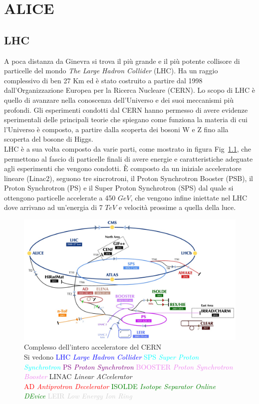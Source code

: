 \chapter{ALICE}

\section{LHC}
A poca distanza da Ginevra si trova il più grande e il più potente collisore di particelle del mondo \textit{The Large Hadron Collider} (LHC). Ha un raggio complessivo di ben 27 Km ed è stato costruito a partire dal 1998 dall'Organizzazione Europea per la Ricerca Nucleare (CERN). Lo scopo di LHC è quello di avanzare nella conoscenza dell'Universo e dei suoi meccanismi più profondi. Gli esperimenti condotti dal CERN hanno permesso di avere evidenze sperimentali delle principali teorie che spiegano come funziona la materia di cui l'Universo è composto,  a partire dalla scoperta dei bosoni W e Z fino alla scoperta del bosone di Higgs. 
\\LHC è a sua volta composto da varie parti, come mostrato in figura Fig~\ref{fig:CERNcomplex}, che permettono al fascio di particelle finali di avere energie e caratteristiche adeguate agli esperimenti che vengono condotti. È composto da un iniziale acceleratore lineare (Linac2), seguono tre sincrotroni, il Proton Synchrotron Booster (PSB), il Proton Synchrotron (PS) e il Super Proton Synchrotron (SPS) dal quale si ottengono particelle accelerate a 450 $GeV$, che vengono infine iniettate nel LHC dove arrivano ad un'energia di 7 $TeV$ e velocità prossime a quella della luce. \cite{tesi_barbano}
  \captionsetup{justification=centerlast} 
    \begin{figure}[htbp]
        \centering
        \includegraphics[width=0.8\linewidth]{ALICE/CernComplex_2018.png}        \caption{Complesso dell'intero acceleratore del CERN \\\small{Si vedono  \textcolor{blue}{LHC \textit{Large Hadron Collider}} \textcolor{cyan}{SPS \textit{Super Proton Synchrotron}} \textcolor{purple}{ PS \textit{Proton Synchrotron}} \textcolor{violet}{BOOSTER \textit{ Proton Synchrotron Booster}} LINAC \textit{Linear ACcelerator}} \\{\footnotesize  \textcolor{red}{AD \textit{Antiprotron Decelerator}} \textcolor{green}{ISOLDE \textit{Isotope Separator Online DEvice}}  \textcolor{lightgray}{LEIR \textit{Low Energy Ion Ring}} }}
        \label{fig:CERNcomplex}
    \end{figure}
    
